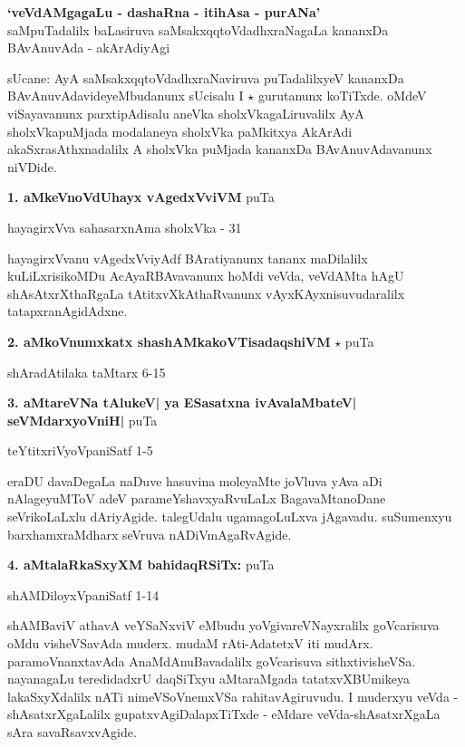 \begin{center}
\medskip
\noindent\textbf{\large `veVdAMgagaLu - dashaRna - itihAsa - purANa'}\\
\large{saMpuTadalilx baLasiruva saMsakxqqtoVdadhxraNagaLa kananxDa}\\
\large{BAvAnuvAda - akArAdiyAgi}
\end{center}

sUcane: AyA saMsakxqqtoVdadhxraNaviruva puTadalilxyeV kananxDa BAvAnuvAdavideyeMbudanunx sUcisalu I  $\star$ gurutanunx koTiTxde. oMdeV viSayavanunx parxtipAdisalu aneVka sholxVkagaLiruvalilx AyA sholxVkapuMjada modalaneya sholxVka paMkitxya AkArAdi akaSxrasAthxnadalilx A sholxVka puMjada kananxDa BAvAnuvAdavanunx niVDide.

\medskip
\medskip
\noindent\textbf{1. aMkeVnoVdUhayx vAgedxVviVM} \hfill puTa \pageref{32}

\hfill hayagirxVva sahasarxnAma sholxVka - 31

hayagirxVvanu vAgedxVviyAdf BAratiyanunx tananx maDilalilx kuLiLxrisikoMDu AcAyaRBAvavanunx hoMdi veVda, veVdAMta hAgU shAsAtxrXthaRgaLa tAtitxvXkAthaRvanunx vAyxKAyxnisuvudaralilx tatapxranAgidAdxne.

\medskip
\noindent\textbf{2. aMkoVnumxkatx shashAMkakoVTisadaqshiVM} $\star$ \hfill puTa \pageref{31a}

\hfill shAradAtilaka taMtarx 6-15

\medskip
\noindent\textbf{3. aMtareVNa tAlukeV| ya ESasatxna ivAvalaMbateV| seVMdarxyoVniH|} \hfill puTa \pageref{26}

\hfill teYtitxriVyoVpaniSatf 1-5

eraDU davaDegaLa naDuve hasuvina moleyaMte joVluva yAva aDi nAlageyuMToV adeV parameYshavxyaRvuLaLx BagavaMtanoDane seVrikoLaLxlu dAriyAgide. talegUdalu ugamagoLuLxva jAgavadu. suSumenxyu barxhamxraMdharx seVruva nADiVmAgaRvAgide.

\medskip
\noindent\textbf{4. aMtalaRkaSxyXM bahidaqRSiTx:} \hfill puTa \pageref{244}

\hfill shAMDiloyxVpaniSatf 1-14

shAMBaviV athavA veYSaNxviV eMbudu yoVgivareVNayxralilx goVcarisuva oMdu visheVSavAda muderx. mudaM rAti-AdatetxV iti mudArx. paramoVnanxtavAda AnaMdAnuBavadalilx goVcarisuva sithxtivisheVSa. nayanagaLu teredidadxrU daqSiTxyu aMtaraMgada tatatxvXBUmikeya lakaSxyXdalilx nATi nimeVSoVnemxVSa rahitavAgiruvudu. I muderxyu veVda - shAsatxrXgaLalilx gupatxvAgiDalapxTiTxde - eMdare veVda-shAsatxrXgaLa sAra savaRsavxvAgide.

